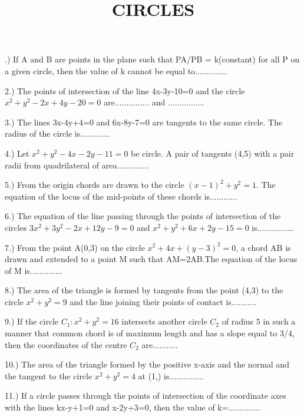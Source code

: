 \documentclass{article}
\title{CIRCLES}
\begin{document}
.) If A and B are points in the plane such that PA/PB = k(constant) for all P on a given circle, then the value of k cannot be equal to..............

\vspace{5mm}
2.) The points of intersection of the line 4x-3y-10=0 and the circle $x^2+y^2-2x+4y-20 = 0$ are............... and ................

\vspace{5mm}
3.)   The lines 3x-4y+4=0 and 6x-8y-7=0 are tangents to the same circle. The radius of the circle is.............

\vspace{5mm}
4.)   Let $x^2+y^2-4x-2y-11=0$ be circle. A pair of tangents (4,5) with a pair radii from quadrilateral of area..............

\vspace{5mm}
5.) From the origin chords are drawn to the circle $(x-1)^2+y^2=1$. The equation of the locus of the mid-points of these chords is............

\vspace{5mm}
6.) The equation of the line passing through the points of intersection of the circles $3x^2+3y^2-2x+12y-9=0$ and $x^2+y^2+6x+2y-15=0$ is................

\vspace{5mm}
7.) From the point A(0,3) on the circle $x^2+4x+(y-3)^2=0$, a chord AB is drawn and extended to a point M such that AM=2AB.The equation of the locus of M is..............

\vspace{5mm}
8.) The area of the triangle is formed by tangents from the point (4,3) to the circle $x^2+y^2=9$ and the line joining their points of contact is........... 

\vspace{5mm}
9.) If the circle $C_1:x^2+y^2=16$ intersects another circle $C_2$ of radius 5 in such a manner that common chord is of maximum length and has a slope equal to 3/4, then the coordinates of the centre $C_2$ are...........

\vspace{5mm}
10.) The area of the triangle formed by the positive x-axis and the normal and the tangent to the circle $x^2+y^2=4$ at (1,)       is...............

\vspace{5mm}
11.) If a circle passes through the points of intersection of the coordinate axes with the lines kx-y+1=0 and x-2y+3=0, then the value of k=..............
\end{document}
